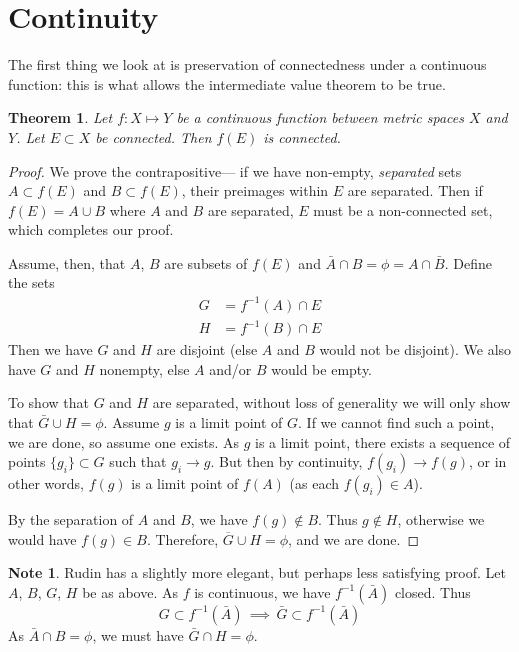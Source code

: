 \documentclass{article}
\newtheorem{thm}{Theorem}[section]
\theoremstyle{definition}
\newtheorem*{note*}{Note}
\newcommand{\inv}[1]{\ensuremath{{#1^{-1}}}}
\begin{document}
{}

\section{Continuity}
The first thing we look at is preservation of connectedness under a
continuous function: this is what allows the intermediate value theorem
to be true.
\begin{thm}
  Let $f: X \mapsto Y$ be a continuous function between metric spaces $X$
  and $Y$. Let $E \subset X$ be connected. Then $f(E)$ is connected.
\end{thm}
\begin{proof}
  We prove the contrapositive--- if we have non-empty, \emph{separated} sets
  $A \subset f(E)$ and $B \subset f(E)$,
  their preimages within $E$ are separated. Then if
  \(f(E) = A \cup B\) where $A$ and $B$ are separated, $E$ must be a
  non-connected set, which completes our proof.

  Assume, then, that $A$, $B$ are subsets of $f(E)$ and
  $\bar{A}\cap B = \phi = A \cap \bar{B}$. Define the sets
  \begin{eqnarray*}
    G & = f^{-1}(A) \cap E \\
    H & = f^{-1}(B) \cap E
  \end{eqnarray*}
  Then we have $G$ and $H$ are disjoint (else $A$ and $B$ would not be
  disjoint). We also have $G$ and $H$ nonempty, else $A$ and/or $B$
  would be empty.

  To show that $G$ and $H$ are separated, without loss of generality we
  will only show that $\bar G \cup H = \phi$. Assume $g$ is a limit
  point of $G$. If we cannot find such a point, we
  are done, so assume one exists. As $g$ is a limit point, there exists
  a sequence of points $\{g_i\} \subset G$ such that
  $g_i \rightarrow g$. But then by continuity,
  $f(g_i) \rightarrow f(g)$, or in other words, $f(g)$ is a limit point
  of $f(A)$ (as each $f(g_i) \in A$).

  By the separation of $A$ and $B$, we have $f(g)\not\in B$. Thus
  $g\not\in H$, otherwise we would have $f(g)\in B$. Therefore,
  $\overline G \cup H = \phi$, and we are done.
 
\end{proof}
\begin{note*}
  Rudin has a slightly more elegant, but perhaps less satisfying
  proof. Let $A$, $B$, $G$, $H$ be as above. As $f$ is continuous, we
  have $\inv{f}(\bar A)$ closed. Thus
  \[G \subset f^{-1}(\bar A) \,\implies\, \bar G \subset \inv{f}(\bar A) \]
  As $\bar A \cap B = \phi$, we must have $\bar G \cap H = \phi$.
\end{note*}
\end{document}
